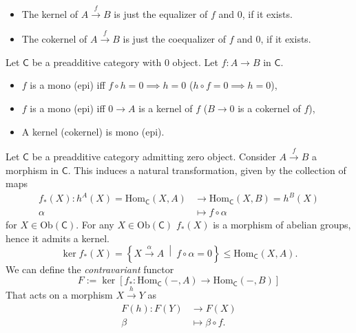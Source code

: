 \begin{rem}\leavevmode\vspace{-.2\baselineskip}
	\begin{itemize}
		\item The kernel of $A \xrightarrow{f} B$ is just the equalizer of $f$ and $0$, if it exists.
		\item The cokernel of $A \xrightarrow{f} B$ is just the coequalizer of $f$ and $0$, if it exists.
	\end{itemize}
\end{rem}

\begin{lem}
	Let $\mathsf{C}$ be a preadditive category with $0$ object.
	Let $f: A \to B$ in $\mathsf{C}$.
	\begin{itemize}
		\item $f$ is a mono (epi) iff $f \circ h = 0 \implies h = 0$ ($h \circ f = 0 \implies h = 0$),
		\item $f$ is a mono (epi) iff $0 \to A$ is a kernel of $f$ ($B \to 0$ is a cokernel of $f$),
		\item A kernel (cokernel) is mono (epi).
	\end{itemize}
\end{lem} 

\begin{defn}
	Let $\mathsf{C}$ be a preadditive category admitting zero object.
	Consider $A \xrightarrow{f} B$ a morphism in $\mathsf{C}$.
	This induces a natural transformation, given by the collection of maps
	\begin{align}
		f_*(X): h^A(X) = \mathrm{Hom}_{\mathsf{C}} \left( X, A \right) &\to \mathrm{Hom}_{\mathsf{C}} \left( X, B \right) = h^B(X) \\
		\alpha &\mapsto f \circ \alpha
	\end{align} 
	for $X \in \mathrm{Ob} \left(\mathsf{C}\right)$.
	For any $X \in \mathrm{Ob} \left(\mathsf{C}\right)$ $f_*(X)$ is a morphism of abelian groups, hence it admits a kernel.
	\begin{equation}
		\ker f_*(X) = \left\{ X \xrightarrow{\alpha} A  \ \middle|\ f \circ \alpha = 0\right\} \leq \mathrm{Hom}_{\mathsf{C}} \left( X, A \right)
	.\end{equation} 
	We can define the \textit{contravariant} functor
	\begin{equation}
	F := \ker \left[ f_*: \mathrm{Hom}_{\mathsf{C}} \left( -, A \right) \to \mathrm{Hom}_{\mathsf{C}} \left( -, B \right) \right]
	\end{equation} 
	That acts on a morphism $X \xrightarrow{h} Y$ as
	 \begin{align}
		 F(h): F(Y) &\to F(X) \\
		\beta &\mapsto \beta \circ f
	.\end{align} 
\end{defn}

